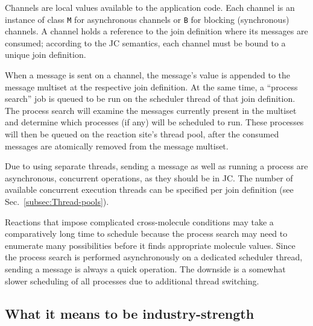 \documentclass[sigplan,10pt]{acmart}\settopmatter{}
\begin{document}
Channels are local values available to the application code. Each
channel is an instance of class \texttt{M} for asynchronous channels
or \texttt{B} for blocking (synchronous) channels. A channel holds
a reference to the join definition where its messages are consumed;
according to the JC semantics, each channel must be bound to a unique
join definition.

When a message is sent on a channel, the message's value is appended
to the message multiset at the respective join definition. At the
same time, a ``process search'' job is queued to be run on the scheduler
thread of that join definition. The process search will examine the
messages currently present in the multiset and determine which processes
(if any) will be scheduled to run. These processes will then be queued
on the reaction site's thread pool, after the consumed messages are
atomically removed from the message multiset. 

Due to using separate threads, sending a message as well as running
a process are asynchronous, concurrent operations, as they should
be in JC. The number of available concurrent execution threads can
be specified per join definition (see Sec.~\ref{subsec:Thread-pools}).

Reactions that impose complicated cross-molecule conditions may take
a comparatively long time to schedule because the process search may
need to enumerate many possibilities before it finds appropriate molecule
values. Since the process search is performed asynchronously on a
dedicated scheduler thread, sending a message is always a quick operation.
The downside is a somewhat slower scheduling of all processes due
to additional thread switching.

\subsection{What it means to be industry-strength}
\end{document}
